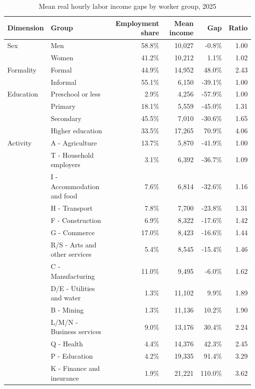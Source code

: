 \begin{table}[!htbp]
  \centering
  \caption{Mean real hourly labor income gaps by worker group, 2025}
  \label{tab:descriptive-wage-gaps-2025}
  \scriptsize
  \begin{tabular}{lp{}rrrr}
    \toprule
    Dimension & Group & Employment share & Mean income & Gap & Ratio \\
    \midrule
    Sex & Men & 58.8\% & 10,027 & -0.8\% & 1.00 \\
     & Women & 41.2\% & 10,212 & 1.1\% & 1.02 \\
    \midrule
    Formality & Formal & 44.9\% & 14,952 & 48.0\% & 2.43 \\
     & Informal & 55.1\% & 6,150 & -39.1\% & 1.00 \\
    \midrule
    Education & Preschool or less & 2.9\% & 4,256 & -57.9\% & 1.00 \\
     & Primary & 18.1\% & 5,559 & -45.0\% & 1.31 \\
     & Secondary & 45.5\% & 7,010 & -30.6\% & 1.65 \\
     & Higher education & 33.5\% & 17,265 & 70.9\% & 4.06 \\
    \midrule
    Activity & A - Agriculture & 13.7\% & 5,870 & -41.9\% & 1.00 \\
     & T - Household employers & 3.1\% & 6,392 & -36.7\% & 1.09 \\
     & I - Accommodation and food & 7.6\% & 6,814 & -32.6\% & 1.16 \\
     & H - Transport & 7.8\% & 7,700 & -23.8\% & 1.31 \\
     & F - Construction & 6.9\% & 8,322 & -17.6\% & 1.42 \\
     & G - Commerce & 17.0\% & 8,423 & -16.6\% & 1.44 \\
     & R/S - Arts and other services & 5.4\% & 8,545 & -15.4\% & 1.46 \\
     & C - Manufacturing & 11.0\% & 9,495 & -6.0\% & 1.62 \\
     & D/E - Utilities and water & 1.3\% & 11,102 & 9.9\% & 1.89 \\
     & B - Mining & 1.3\% & 11,136 & 10.2\% & 1.90 \\
     & L/M/N - Business services & 9.0\% & 13,176 & 30.4\% & 2.24 \\
     & Q - Health & 4.4\% & 14,376 & 42.3\% & 2.45 \\
     & P - Education & 4.2\% & 19,335 & 91.4\% & 3.29 \\
     & K - Finance and insurance & 1.9\% & 21,221 & 110.0\% & 3.62 \\

\end{tabular}
\end{table}
